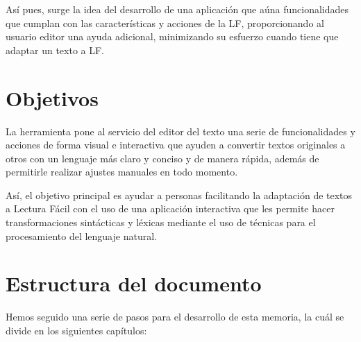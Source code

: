 \setlength{\parskip}{10pt} 
 
Así pues, surge la idea del desarrollo de una aplicación que aúna funcionalidades que cumplan con las características y acciones de la LF, proporcionando al usuario editor una ayuda adicional, minimizando su esfuerzo cuando tiene que adaptar un texto a LF.


\section{Objetivos}
La herramienta pone al servicio del editor del texto una serie de funcionalidades y acciones de forma visual e interactiva que ayuden a convertir textos originales a otros con un lenguaje más claro y conciso y de manera rápida, además de permitirle realizar ajustes manuales en todo momento. 

 \setlength{\parskip}{10pt}
 
Así, el objetivo principal es ayudar a personas facilitando la adaptación de textos a Lectura Fácil con el uso de una aplicación interactiva que les permite hacer transformaciones sintácticas y léxicas mediante el uso de técnicas para el procesamiento del lenguaje natural. 

 

\section{Estructura del documento}


Hemos seguido una serie de pasos para el desarrollo de esta memoria, la cuál se divide en los siguientes capítulos:

